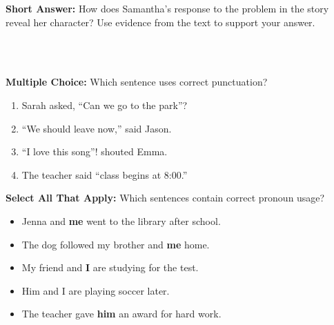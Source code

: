 \documentclass[12pt]{article}
\begin{document}
\begin{tcolorbox}[colframe=black!50, colback=white, title=Question 3]
\textbf{Short Answer:} How does Samantha’s response to the problem in the story reveal her character? Use evidence from the text to support your answer.  

\vspace{2em}
\\[0.8cm] \underline{\hspace{15.8cm}}  
    \\[0.8cm] \underline{\hspace{15.8cm}}  
\end{tcolorbox}

\begin{tcolorbox}[colframe=black!50, colback=white, title=Question 4]
\textbf{Multiple Choice:} Which sentence uses correct punctuation?  
\begin{enumerate}[label=(\Alph*)]
\item Sarah asked, “Can we go to the park”?  
\item “We should leave now,” said Jason.  
\item “I love this song”! shouted Emma.  
\item The teacher said “class begins at 8:00.”  
\end{enumerate}
\end{tcolorbox}

\begin{tcolorbox}[colframe=black!50, colback=white, title=Question 5]
\textbf{Select All That Apply:} Which sentences contain correct pronoun usage?  
\begin{itemize}
\item Jenna and \textbf{me} went to the library after school.  
\item The dog followed my brother and \textbf{me} home.  
\item My friend and \textbf{I} are studying for the test.  
\item Him and I are playing soccer later.  
\item The teacher gave \textbf{him} an award for hard work.  
\end{itemize}
\end{tcolorbox}
\end{document}
